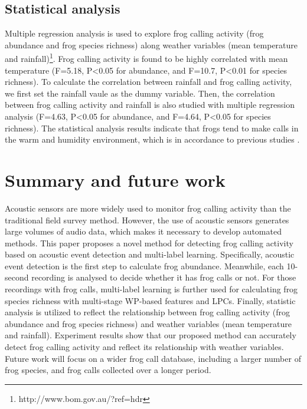 \subsection{Statistical analysis}
Multiple regression analysis is used to explore frog calling activity (frog abundance and frog species richness) along weather variables (mean temperature and rainfall)\footnote[5] {http://www.bom.gov.au/?ref=hdr}. Frog calling activity is found to be highly correlated with mean temperature (F=5.18, P\textless0.05 for abundance, and F=10.7, P\textless0.01 for species richness). To calculate the correlation between rainfall and frog calling activity, we first set the rainfall vaule as the dummy variable. Then, the correlation between frog calling activity and rainfall is also studied with multiple regression analysis (F=4.63, P\textless0.05 for abundance, and F=4.64, P\textless0.05 for species richness). The statistical analysis results indicate that frogs tend to make calls in the warm and humidity environment, which is in accordance to previous studies \cite{akmentins2015patterns, canavero2008calling}.






\section{Summary and future work}
Acoustic sensors are more widely used to monitor frog calling activity than the traditional field survey method. However, the use of acoustic sensors generates large volumes of audio data, which makes it necessary to develop automated methods. This paper proposes a novel method for detecting frog calling activity based on acoustic event detection and multi-label learning. Specifically,
acoustic event detection is the first step to calculate frog abundance. Meanwhile, each 10-second recording is analysed to decide whether it has frog calls or not. For those recordings with frog calls, multi-label learning is further used for calculating frog species richness with multi-stage WP-based features and LPCs. Finally, statistic analysis is utilized to reflect the relationship between frog calling activity (frog abundance and frog species richness) and weather variables (mean temperature and rainfall). Experiment results show that our proposed method can accurately detect frog calling activity and reflect its relationship with weather variables. Future work will focus on a wider frog call database, including a larger number of frog species, and frog calls collected over a longer period.


